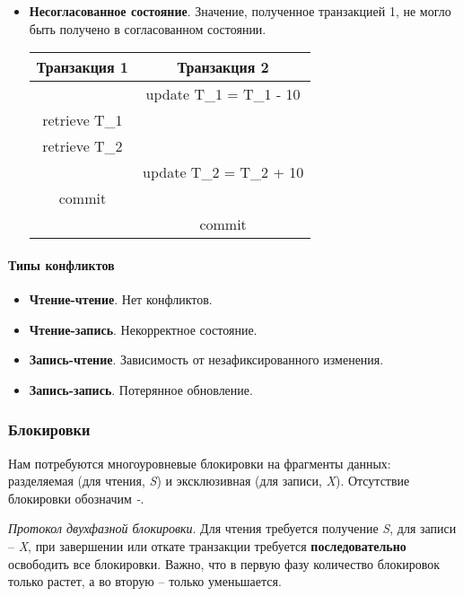 \begin{itemize}
\begin{center}
        \end{center}
    \item \textbf{Несогласованное состояние}. Значение, полученное транзакцией 1, не могло быть
        получено в согласованном состоянии.
        \begin{center}
            \begin{tabular}{|c c|}
                \hline
                Транзакция 1 & Транзакция 2 \\
                \hline
                & update T\_1 = T\_1 - 10 \\
                retrieve T\_1 & \\
                retrieve T\_2 & \\
                & update T\_2 = T\_2 + 10 \\
                commit & \\
                & commit \\
                \hline
            \end{tabular}
        \end{center}
\end{itemize}

\paragraph{Типы конфликтов}

\begin{itemize}
    \item \textbf{Чтение-чтение}. Нет конфликтов.
    \item \textbf{Чтение-запись}. Некорректное состояние.
    \item \textbf{Запись-чтение}. Зависимость от незафиксированного изменения.
    \item \textbf{Запись-запись}. Потерянное обновление.
\end{itemize}

\subsubsection{Блокировки}

Нам потребуются многоуровневые блокировки на фрагменты данных: разделяемая (для чтения, \textit{S})
и эксклюзивная (для записи, \textit{X}). Отсутствие блокировки обозначим \textit{-}.

\begin{definition}
    \textit{Протокол двухфазной блокировки}. Для чтения требуется получение \textit{S}, для
    записи -- \textit{X}, при завершении или откате транзакции требуется
    \textbf{последовательно} освободить все блокировки. Важно, что в первую фазу количество
    блокировок только растет, а во вторую -- только уменьшается.
\end{definition}


